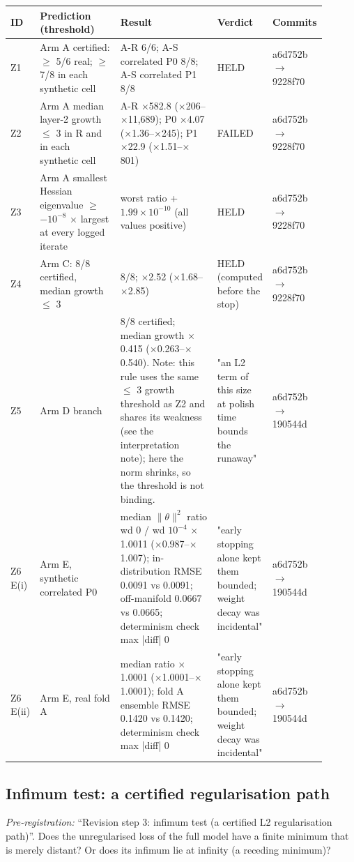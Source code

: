 {\footnotesize\setlength{\tabcolsep}{3pt}
\begin{longtable}{R{0.07\linewidth} R{0.28\linewidth} R{0.35\linewidth} R{0.09\linewidth} R{0.11\linewidth}}
\toprule
ID & Prediction (threshold) & Result & Verdict & Commits \\
\midrule
\endhead
Z1 & Arm A certified: $\geq$ 5/6 real; $\geq$ 7/8 in each synthetic cell & A-R 6/6; A-S correlated P0 8/8; A-S correlated P1 8/8 & HELD & a6d752b$\to$\allowbreak 9228f70 \\
Z2 & Arm A median layer-2 growth $\leq$ 3 in R and in each synthetic cell & A-R $\times$582.8 ($\times$206--$\times$11,689); P0 $\times$4.07 ($\times$1.36--$\times$245); P1 $\times$22.9 ($\times$1.51--$\times$801) & FAILED & a6d752b$\to$\allowbreak 9228f70 \\
Z3 & Arm A smallest Hessian eigenvalue $\geq$ $-10^{-8}$ $\times$ largest at every logged iterate & worst ratio +$1.99\times10^{-10}$ (all values positive) & HELD & a6d752b$\to$\allowbreak 9228f70 \\
Z4 & Arm C: 8/8 certified, median growth $\leq$ 3 & 8/8; $\times$2.52 ($\times$1.68--$\times$2.85) & HELD (computed before the stop) & a6d752b$\to$\allowbreak 9228f70 \\
Z5 & Arm D branch & 8/8 certified; median growth $\times$0.415 ($\times$0.263--$\times$0.540). Note: this rule uses the same $\leq$ 3 growth threshold as Z2 and shares its weakness (see the interpretation note); here the norm shrinks, so the threshold is not binding. & "an L2 term of this size at polish time bounds the runaway" & a6d752b$\to$\allowbreak 190544d \\
Z6 E(i) & Arm E, synthetic correlated P0 & median $\|\theta\|^{2}$ ratio wd 0 / wd $10^{-4}$ $\times$1.0011 ($\times$0.987--$\times$1.007); in-distribution RMSE 0.0091 vs 0.0091; off-manifold 0.0667 vs 0.0665; determinism check max |diff| 0 & "early stopping alone kept them bounded; weight decay was incidental" & a6d752b$\to$\allowbreak 190544d \\
Z6 E(ii) & Arm E, real fold A & median ratio $\times$1.0001 ($\times$1.0001--$\times$1.0001); fold A ensemble RMSE 0.1420 vs 0.1420; determinism check max |diff| 0 & "early stopping alone kept them bounded; weight decay was incidental" & a6d752b$\to$\allowbreak 190544d \\
\bottomrule
\end{longtable}}
\subsection{Infimum test: a certified regularisation path}
\noindent\textit{Pre-registration:} ``Revision step 3: infimum test (a certified L2 regularisation path)''. Does the unregularised loss of the full model have a finite minimum that is merely distant? Or does its infimum lie at infinity (a receding minimum)?

